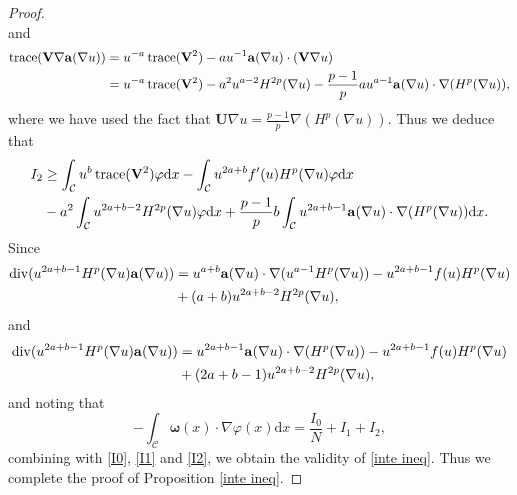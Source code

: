\documentclass[12pt]{amsart}
\theoremstyle{definition}
\theoremstyle{remark}
\theoremstyle{conclusion}
\theoremstyle{conjecture}
\numberwithin{equation}{section}
\begin{document}
\begin{proof}
\begin{equation*}
\end{equation*}
and
\begin{equation*}
  \begin{aligned}
  \operatorname{trace}(\mathbf{V}\nabla {\bf{a}}(\nabla u))&=u^{-a}\operatorname{trace}(\mathbf{V}^2)-au^{-1}{\bf{a}}(\nabla u)\cdot(\mathbf{V}\nabla u)\\
    &=u^{-a}\operatorname{trace}(\mathbf{V}^2)-a^2u^{a-2}H^{2p}(\nabla u)-\frac{p-1}{p}au^{a-1}{\bf{a}}(\nabla u)\cdot\nabla(H^p(\nabla u)),
  \end{aligned}
\end{equation*}
where we have used the fact that  $\mathbf{U}\nabla u=\frac{p-1}{p}\nabla(H^p(\nabla u))$. Thus we deduce that
\begin{equation}\label{I2}
  \begin{aligned}
    I_2&\geq\int_{\mathcal{C}}u^b\operatorname{trace}(\mathbf{V}^2)\varphi\mathrm{d}x-\int_{\mathcal{C}}u^{2a+b}f^{\prime}(u)H^{p}(\nabla u)\varphi\mathrm{d}x\\
    &-a^2\int_{\mathcal{C}}u^{2a+b-2}H^{2p}(\nabla u)\varphi\mathrm{d}x+\frac{p-1}{p}b\int_{\mathcal{C}}u^{2a+b-1}{\bf{a}}(\nabla u)\cdot\nabla (H^{p}(\nabla u))\mathrm{d}x.
  \end{aligned}
\end{equation}
Since
\begin{equation*}
  \begin{aligned}
    \operatorname{div}(u^{2a+b-1}H^p(\nabla u){\bf{a}}(\nabla u))
    &=u^{a+b}{\bf{a}}(\nabla u)\cdot\nabla (u^{a-1}H^p(\nabla u))-u^{2a+b-1}f(u)H^p(\nabla u)\\
    &+(a+b)u^{2a+b-2}H^{2p}(\nabla u),
  \end{aligned}
\end{equation*}
and
\begin{equation*}
  \begin{aligned}
    \operatorname{div}(u^{2a+b-1}H^p(\nabla u){\bf{a}}(\nabla u))
    &=u^{2a+b-1}{\bf{a}}(\nabla u)\cdot\nabla (H^p(\nabla u))-u^{2a+b-1}f(u)H^p(\nabla u)\\
    &+(2a+b-1)u^{2a+b-2}H^{2p}(\nabla u),
  \end{aligned}
\end{equation*}
and noting that
$$ - \int_{\mathcal{C}}\bm{\omega}(x)\cdot\nabla\varphi(x)\mathrm{d}x=\frac{I_0}{N}+I_1+I_2,$$
combining with \eqref{I0}, \eqref{I1} and \eqref{I2}, we obtain the validity of \eqref{inte ineq}. Thus we complete the proof of Proposition \ref{inte ineq}.
\end{proof}
\end{document}
